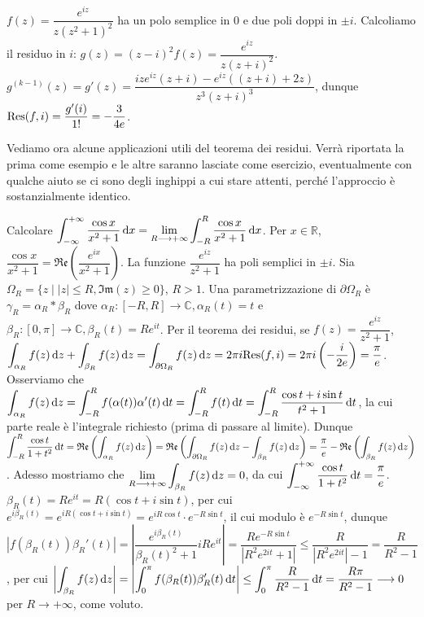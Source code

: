 \begin{ex}
  $f(z)=\dfrac{e^{iz}}{z(z^2+1)^2}$ ha un polo semplice in $0$ e due poli doppi in $\pm i$. Calcoliamo il residuo in $i$: $g(z)=(z-i)^2f(z)=\dfrac{e^{iz}}{z(z+i)^2}$. $g^{(k-1)}(z)=g'(z)=\dfrac{ize^{iz}(z+i)-e^{iz}((z+i)+2z)}{z^3(z+i)^3}$, dunque $\text{Res}(f,i)=\dfrac{g'(i)}{1!}=-\dfrac{3}{4e}$.
\end{ex}

Vediamo ora alcune applicazioni utili del teorema dei residui. Verrà riportata la prima come esempio e le altre saranno lasciate come esercizio, eventualmente con qualche aiuto se ci sono degli inghippi a cui stare attenti, perché l'approccio è sostanzialmente identico.

\begin{ex}
  Calcolare $\displaystyle \int_{-\infty}^{+\infty} \frac{\cos{x}}{x^2+1}\mathop{}\!\mathrm{d} x=\lim_{R \longrightarrow +\infty} \int_{-R}^R \dfrac{\cos{x}}{x^2+1}\mathop{}\!\mathrm{d} x$. Per $x \in \mathbb{R}$, $\dfrac{\cos{x}}{x^2+1}=\mathfrak{Re}\left(\dfrac{e^{ix}}{x^2+1}\right)$.
  La funzione $\dfrac{e^{iz}}{z^2+1}$ ha poli semplici in $\pm i$. Sia $\Omega_R=\{z \mid |z| \le R, \mathfrak{Im}(z) \ge 0\}$, $R>1$. Una parametrizzazione di $\partial\Omega_R$ è $\gamma_R=\alpha_R*\beta_R$ dove $\alpha_R:[-R, R] \longrightarrow \mathbb{C}, \alpha_R(t)=t$ e $\beta_R:[0, \pi] \longrightarrow \mathbb{C}, \beta_R(t)=Re^{it}$.
  Per il teorema dei residui, se $f(z)=\dfrac{e^{iz}}{z^2+1}$, $\displaystyle \int_{\alpha_R} f(z)\mathop{}\!\mathrm{d} z+\int_{\beta_R}f(z)\mathop{}\!\mathrm{d} z=\int_{\partial \Omega_R} f(z)\mathop{}\!\mathrm{d} z=2\pi i\text{Res}(f, i)=2\pi i\left(-\frac{i}{2e}\right)=\frac{\pi}{e}$.
  Osserviamo che $\displaystyle \int_{\alpha_R} f(z)\mathop{}\!\mathrm{d} z=\int_{-R}^R f(\alpha(t))\alpha'(t)\mathop{}\!\mathrm{d} t=\int_{-R}^R f(t)\mathop{}\!\mathrm{d} t=\int_{-R}^R \frac{\cos{t}+i\sin{t}}{t^2+1}\mathop{}\!\mathrm{d} t$, la cui parte reale è l'integrale richiesto (prima di passare al limite).
  Dunque $\displaystyle \int_{-R}^R \dfrac{\cos{t}}{1+t^2}\mathop{}\!\mathrm{d} t=\mathfrak{Re}\left(\int_{\alpha_R} f(z)\mathop{}\!\mathrm{d} z\right)=\mathfrak{Re}\left(\int_{\partial \Omega_R} f(z)\mathop{}\!\mathrm{d} z-\int_{\beta_R}f(z)\mathop{}\!\mathrm{d} z\right)=\frac{\pi}{e}-\mathfrak{Re}\left(\int_{\beta_R} f(z) \mathop{}\!\mathrm{d} z\right)$.
  Adesso mostriamo che $\displaystyle \lim_{R \longrightarrow +\infty} \int_{\beta_R} f(z)\mathop{}\!\mathrm{d} z=0$, da cui $\displaystyle \int_{-\infty}^{+\infty} \frac{\cos{t}}{1+t^2}\mathop{}\!\mathrm{d} t=\frac{\pi}{e}$.
  $\beta_R(t)=Re^{it}=R(\cos{t}+i\sin{t})$, per cui $e^{i\beta_R(t)}=e^{iR(\cos{t}+i\sin{t})}=e^{iR\cos{t}}\cdot e^{-R\sin{t}}$, il cui modulo è $e^{-R\sin{t}}$, dunque $| f(\beta_R(t))\beta_R'(t)|=\left|\dfrac{e^{i\beta_R(t)}}{\beta_R(t)^2+1}iRe^{it}\right|=\dfrac{Re^{-R\sin{t}}}{|R^2e^{2it}+1|} \le \dfrac{R}{|R^2e^{2it}|-1}=\dfrac{R}{R^2-1}$, per cui
  $\displaystyle \left|\int_{\beta_R}f(z)\mathop{}\!\mathrm{d} z\right|=\left|\int_0^\pi f(\beta_R(t))\beta_R'(t)\mathop{}\!\mathrm{d} t\right| \le \int_0^\pi \frac{R}{R^2-1}\mathop{}\!\mathrm{d} t=\dfrac{R\pi}{R^2-1} \longrightarrow 0$ per $R \longrightarrow +\infty$, come voluto.
\end{ex}

